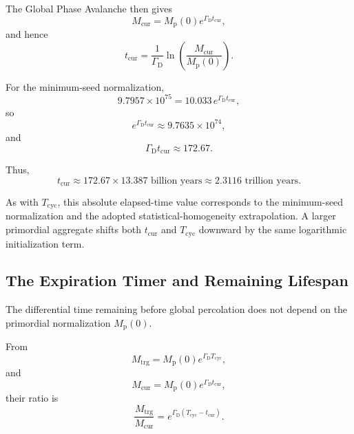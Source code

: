 The Global Phase Avalanche then gives
\begin{equation}
    M_{\mathrm{cur}}
    =
    M_{\mathrm{p}}(0)
    e^{\Gamma_{\mathrm{D}}t_{\mathrm{cur}}},
\end{equation}
and hence
\begin{equation}
    t_{\mathrm{cur}}
    =
    \frac{1}{\Gamma_{\mathrm{D}}}
    \ln\left(
        \frac{M_{\mathrm{cur}}}
        {M_{\mathrm{p}}(0)}
    \right).
\end{equation}

For the minimum-seed normalization,
\begin{equation}
    9.7957\times10^{75}
    =
    10.033\,
    e^{\Gamma_{\mathrm{D}}t_{\mathrm{cur}}},
\end{equation}
so
\begin{equation}
    e^{\Gamma_{\mathrm{D}}t_{\mathrm{cur}}}
    \approx
    9.7635\times10^{74},
\end{equation}
and
\begin{equation}
    \Gamma_{\mathrm{D}}t_{\mathrm{cur}}
    \approx
    172.67.
\end{equation}

Thus,
\begin{equation}
    t_{\mathrm{cur}}
    \approx
    172.67
    \times
    13.387
    \text{ billion years}
    \approx
    2.3116
    \text{ trillion years}.
\end{equation}

As with $T_{\mathrm{cyc}}$, this absolute elapsed-time value corresponds to the minimum-seed normalization and the adopted statistical-homogeneity extrapolation. A larger primordial aggregate shifts both $t_{\mathrm{cur}}$ and $T_{\mathrm{cyc}}$ downward by the same logarithmic initialization term.

\subsection{The Expiration Timer and Remaining Lifespan}

The differential time remaining before global percolation does not depend on the primordial normalization $M_{\mathrm{p}}(0)$.

From
\begin{equation}
    M_{\mathrm{trg}}
    =
    M_{\mathrm{p}}(0)
    e^{\Gamma_{\mathrm{D}}T_{\mathrm{cyc}}},
\end{equation}
and
\begin{equation}
    M_{\mathrm{cur}}
    =
    M_{\mathrm{p}}(0)
    e^{\Gamma_{\mathrm{D}}t_{\mathrm{cur}}},
\end{equation}
their ratio is
\begin{equation}
    \frac{M_{\mathrm{trg}}}{M_{\mathrm{cur}}}
    =
    e^{\Gamma_{\mathrm{D}}
    (T_{\mathrm{cyc}}-t_{\mathrm{cur}})}.
\end{equation}

